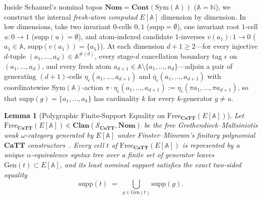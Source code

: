 \documentclass[10pt,twoside,openright]{book}
\theoremstyle{crmplain}
\newtheorem{lemma}[theorem]{Lemma}
\theoremstyle{crmdef}
\theoremstyle{crmremark}
\newcommand{\lean}[1]{\ignorespaces}
\newcommand{\leanwitness}{\ignorespaces}
\begin{document}
Inside Schanuel's nominal topos $\mathbf{Nom} = \mathbf{Cont}(\mathrm{Sym}(\mathbb{A}))$ ($\mathbb{A} = \mathbb{N}$), we construct the internal \emph{fresh-atom computad} $E[\mathbb{A}]$ dimension by dimension. In low dimensions, take two invariant $0$-cells $0, 1$ ($\mathrm{supp} = \emptyset$), one invariant root $1$-cell $u : 0 \to 1$ ($\mathrm{supp}(u) = \emptyset$), and atom-indexed candidate $1$-inverses $v(a_1) : 1 \to 0$ ($a_1 \in \mathbb{A}$, $\mathrm{supp}(v(a_1)) = \{a_1\}$). At each dimension $d + 1 \ge 2$---for every injective $d$-tuple $(a_1, \dots, a_d) \in \mathbb{A}^{\#(d)}$, every stage-$d$ cancellation boundary tag $\epsilon$ on $(a_1, \dots, a_d)$, and every fresh atom $a_{d+1} \in \mathbb{A} \setminus \{a_1, \dots, a_d\}$---adjoin a pair of generating $(d+1)$-cells $\eta_\epsilon(a_1, \dots, a_{d+1})$ and $\bar{\eta}_\epsilon(a_1, \dots, a_{d+1})$ with coordinatewise $\mathrm{Sym}(\mathbb{A})$-action $\pi \cdot \eta_\epsilon(a_1, \dots, a_{d+1}) := \eta_\epsilon(\pi a_1, \dots, \pi a_{d+1})$, so that $\mathrm{supp}(g) = \{a_1, \dots, a_k\}$ has cardinality $k$ for every $k$-generator $g \neq u$.

\begin{lemma}[Polygraphic Finite-Support Equality on {$\mathrm{Free}_{\mathbf{CaTT}}(E[\mathbb{A}])$}]\label{lem:polygraphic-support}%
\lean{HomotopyCRM.cattTerm_exact_support, HomotopyCRM.cattTerm_freshCell_exact_support}%
\leanwitness%
%
Let $\mathrm{Free}_{\mathbf{CaTT}}(E[\mathbb{A}]) \in \mathbf{Clan}(\mathcal{S}_{\mathbf{CaTT}}, \mathbf{Nom})$ be the free Grothendieck--Maltsiniotis weak $\omega$-category generated by $E[\mathbb{A}]$ under Finster--Mimram's finitary polynomial $\mathbf{CaTT}$ constructors~\cite{FinsterMimram17,BCM26}. Every cell $t$ of $\mathrm{Free}_{\mathbf{CaTT}}(E[\mathbb{A}])$ is represented by a unique $\alpha$-equivalence syntax tree over a finite set of generator leaves $\mathrm{Gen}(t) \subset E[\mathbb{A}]$, and its least nominal support satisfies the exact two-sided equality
\[
  \mathrm{supp}(t) \;=\; \bigcup_{g \in \mathrm{Gen}(t)} \mathrm{supp}(g).
\]
\end{lemma}
\end{document}
